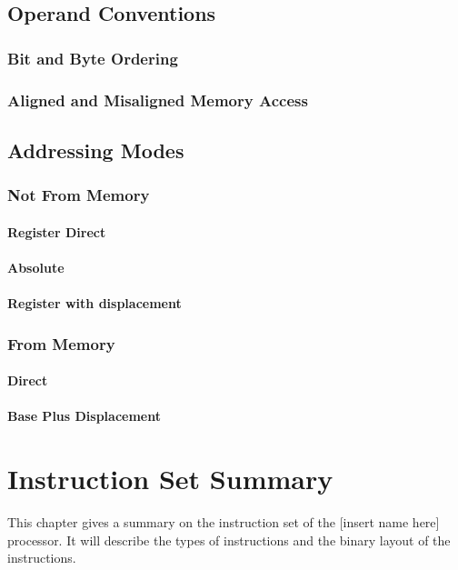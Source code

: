 \documentclass[oneside, a4paper]{memoir}
\begin{document}
\section{Operand Conventions}
\label{sec:Operand Conventions}
\subsection{Bit and Byte Ordering}
\subsection{Aligned and Misaligned Memory Access}

\section{Addressing Modes}
\subsection{Not From Memory}
\subsubsection{Register Direct}
\subsubsection{Absolute}
\subsubsection{Register with displacement}
\subsection{From Memory}
\subsubsection{Direct}
\subsubsection{Base Plus Displacement}

\chapter{Instruction Set Summary}
This chapter gives a summary on the instruction set of the [insert name here] processor. It will describe the types of instructions and the binary layout of the instructions.
\end{document}
